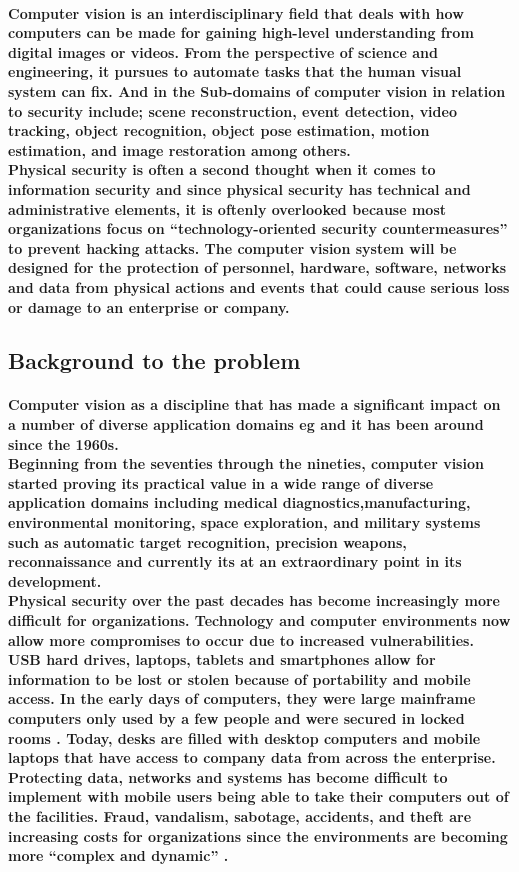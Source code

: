 \documentclass[11pt]{article}
\begin{document}
	 \paragraph{\textmd{Computer vision is an interdisciplinary field that deals with how computers can be made for gaining high-level understanding from digital images or videos. From the perspective of science and engineering, it pursues to automate tasks that the human visual system can fix.\cite{DUMMY:4}
	And in the Sub-domains of computer vision in relation to security include; scene reconstruction, event detection, video tracking, object recognition, object pose estimation, motion estimation, and image restoration among others.\\
	Physical security is often a second thought when it comes to information security and since physical security has technical and administrative elements, it is oftenly overlooked because most organizations focus on “technology-oriented security countermeasures” \cite{DUMMY:2} to prevent hacking attacks.
	The computer vision system will be designed for the protection of personnel, hardware, software, networks and data from physical actions and events that could cause serious loss or damage to an enterprise or company.}}
	 
	 \subsection{\textbf{Background to the problem}}
	  \paragraph{\textmd{Computer vision as a discipline that has made
	 a significant impact on a number of diverse application domains eg \cite{DUMMY:1} and it has been around since the 1960s.\\ Beginning from the seventies through the nineties, computer vision started proving its practical value in a wide range of diverse application domains including medical diagnostics,manufacturing, environmental monitoring, space exploration, and military systems such as automatic target recognition, precision weapons, reconnaissance\cite{DUMMY:3} and currently its at an extraordinary point in its development.\\Physical security over  the past decades has become increasingly more difficult for organizations. Technology and computer environments now allow more compromises to occur
	 due to increased vulnerabilities. USB hard drives, laptops, tablets and smartphones allow for information to be lost or stolen because of portability and mobile access. In the early days of
	 computers, they were large mainframe computers only used by a few people and were secured in locked rooms \cite{DUMMY:2}. Today, desks are filled with desktop computers and mobile laptops that have access to company data from across the enterprise. Protecting data, networks and systems has become difficult to implement with mobile users being able to take their computers out of the facilities. Fraud, vandalism, sabotage, accidents, and theft are increasing costs for organizations since the environments are becoming more “complex and dynamic” \cite{DUMMY:2}.}}
	  
\end{document}
